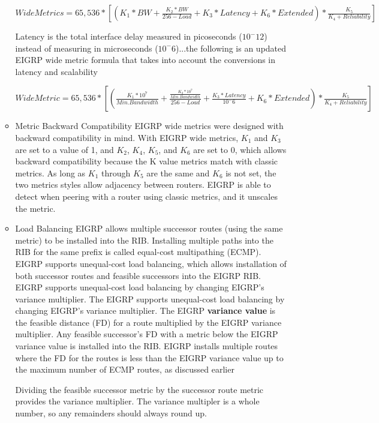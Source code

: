 \documentclass{article}
\begin{document}
\begin{itemize}
\begin{itemize}
				\begin{center}
					$Wide Metrics = 65,536 * [(K_1 * BW + \frac{K_2 * BW}{256 - Load} + K_3 * Latency + K_6 * Extended) * \frac{K_5}{K_4 + Reliability}]$
				\end{center}

				Latency is the total interface delay measured in picoseconds ($10^-12$) instead of measuring in microseconds ($10^-6$)...the following is an updated EIGRP wide metric formula that takes into account the conversions in latency and scalability	

				\begin{center}
					$Wide Metric = 65,536 * [(\frac{K_1 * 10^7}{Min. Bandwidth} + \frac{\frac{K_2 * 10^7}{Min. Bandwidth}}{256 - Load} + \frac{K_3 * Latency}{10^-6} + K_6 * Extended) * \frac{K_5}{K_4 + Reliability}]$
				\end{center}


			\item Metric Backward Compatibility
				EIGRP wide metrics were designed with backward compatibility in mind. With EIGRP wide metrics, $K_1$ and $K_3$ are set to a value of 1, and $K_2$, $K_4$, $K_5$, and $K_6$ are set to 0, which allows backward compatibility because the K value metrics match with classic metrics. As long as $K_1$ through $K_5$ are the same and $K_6$ is not set, the two metrics styles allow adjacency between routers. EIGRP is able to detect when peering with a router using classic metrics, and it unscales the metric.

			\item Load Balancing
				EIGRP allows multiple successor routes (using the same metric) to be installed into the RIB. Installing multiple paths into the RIB for the same prefix is called equal-cost multipathing (ECMP).
				EIGRP supports unequal-cost load balancing, which allows installation of both successor routes and feasible successors into the EIGRP RIB. EIGRP supports unequal-cost load balancing by changing EIGRP's variance multiplier. The EIGRP supports unequal-cost load balancing by changing EIGRP's variance multiplier. The EIGRP \textbf{variance value} is the feasible distance (FD) for a route multiplied by the EIGRP variance multiplier. Any feasible successor's FD with a metric below the EIGRP variance value is installed into the RIB. EIGRP installs multiple routes where the FD for the routes is less than the EIGRP variance value up to the maximum number of ECMP routes, as discussed earlier

				Dividing the feasible successor metric by the successor route metric provides the variance multiplier. The variance multipler is a whole number, so any remainders should always round up.
		\end{itemize}



\end{itemize}
\end{document}
